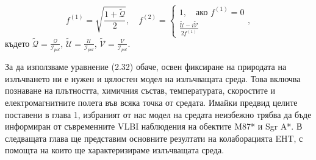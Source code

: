\begin{equation}
	f^{(1)} = \sqrt{\frac{1 + \tilde{\mathcal{Q}}}{2}}, \quad f^{(2)} = \begin{cases}
		1,\quad \text{ако}\,\,f^{(1)} = 0 \\
		\frac{\tilde{\mathcal{U}} - i\tilde{\mathcal{V}}}{2f^{(1)}}
	\end{cases},
\end{equation}
където $\tilde{\mathcal{Q}} = \frac{\mathcal{Q}}{\mathcal{I}_{pol}}$, $\tilde{\mathcal{U}} = \frac{\mathcal{U}}{\mathcal{I}_{pol}}$, $\tilde{\mathcal{V}} = \frac{\mathcal{V}}{\mathcal{I}_{pol}}$.\\

\noindent За да използваме уравнение (2.32) обаче, освен фиксиране на природата на излъчването ни е нужен и цялостен модел на излъчващата среда. Това включва познаване на плътността, химичния състав, температурата, скоростите и електромагнитните полета във всяка точка от средата. Имайки предвид целите поставени в глава 1, избраният от нас модел на средата неизбежно трябва да бъде информиран от съвременните VLBI наблюдения на обектите M87* и Sgr A*. В следващата глава ще представим основните резултати на колаборацията EHT, с помощта на които ще характеризираме излъчващата среда.
\lfoot{}

